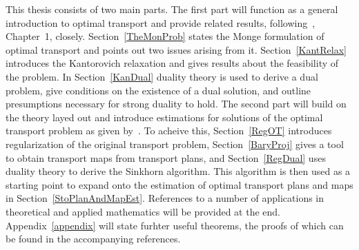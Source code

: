 This thesis consists of two main parts. The first part will function as a general introduction to optimal transport and provide related results, following\ \cite{San2015}, Chapter~1, closely. Section~\ref{TheMonProb} states the Monge formulation of optimal transport and points out two issues arising from it. Section~\ref{KantRelax} introduces the Kantorovich relaxation and gives results about the feasibility of the problem. In Section~\ref{KanDual} duality theory is used to derive a dual problem, give conditions on the existence of a dual solution, and outline presumptions necessary for strong duality to hold. The second part will build on the theory layed out and introduce estimations for solutions of the optimal transport problem as given by\ \cite{Seg2018}. To acheive this, Section~\ref{RegOT} introduces regularization of the original transport problem, Section~\ref{BaryProj} gives a tool to obtain transport maps from transport plans, and Section~\ref{RegDual} uses duality theory to derive the Sinkhorn algorithm. This algorithm is then used as a starting point to expand onto the estimation of optimal transport plans and maps in Section~\ref{StoPlanAndMapEst}. References to a number of applications in theoretical and applied mathematics will be provided at the end. Appendix~\ref{appendix} will state furhter useful theorems, the proofs of which can be found in the accompanying references.